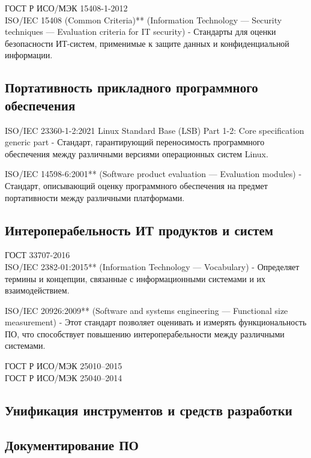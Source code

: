 ГОСТ Р ИСО/МЭК 15408-1-2012\\
ISO/IEC 15408 (Common Criteria)** (Information Technology — Security techniques — Evaluation criteria for IT security)
     - Стандарты для оценки безопасности ИТ-систем, применимые к защите данных и конфиденциальной информации.

\subsection{Портативность прикладного программного обеспечения}

ISO/IEC 23360-1-2:2021
Linux Standard Base (LSB)
Part 1-2: Core specification generic part
     - Стандарт, гарантирующий переносимость программного обеспечения между различными версиями операционных систем Linux.

ISO/IEC 14598-6:2001** (Software product evaluation — Evaluation modules)
     - Стандарт, описывающий оценку программного обеспечения на предмет портативности между различными платформами.

\subsection{Интероперабельность ИТ продуктов и систем}

ГОСТ 33707-2016\\
ISO/IEC 2382-01:2015** (Information Technology — Vocabulary)
     - Определяет термины и концепции, связанные с информационными системами и их взаимодействием.

ISO/IEC 20926:2009** (Software and systems engineering — Functional size measurement)
     - Этот стандарт позволяет оценивать и измерять функциональность ПО, что способствует повышению интероперабельности между различными системами.

ГОСТ Р ИСО/МЭК 25010--2015\\
ГОСТ Р ИСО/МЭК 25040--2014\\

\subsection{Унификация инструментов и средств разработки}


\subsection{Документирование ПО}


